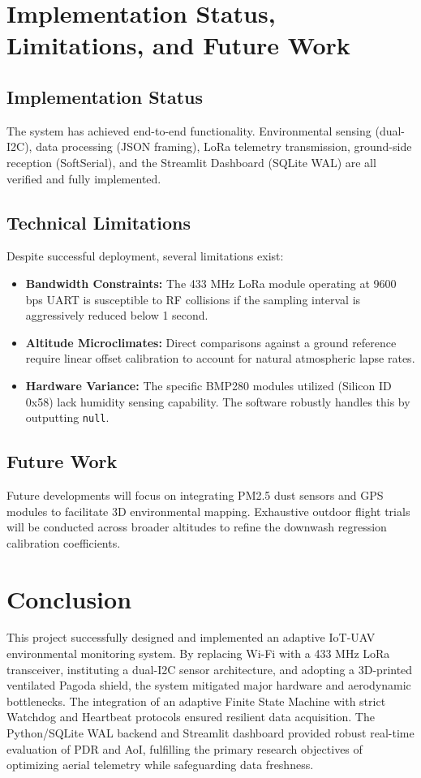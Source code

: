 \documentclass[11pt, a4paper]{article}
\begin{document}
\section{Implementation Status, Limitations, and Future Work}
\subsection{Implementation Status}
The system has achieved end-to-end functionality. Environmental sensing (dual-I2C), data processing (JSON framing), LoRa telemetry transmission, ground-side reception (SoftSerial), and the Streamlit Dashboard (SQLite WAL) are all verified and fully implemented. 

\subsection{Technical Limitations}
Despite successful deployment, several limitations exist:
\begin{itemize}
    \item \textbf{Bandwidth Constraints:} The 433 MHz LoRa module operating at 9600 bps UART is susceptible to RF collisions if the sampling interval is aggressively reduced below 1 second.
    \item \textbf{Altitude Microclimates:} Direct comparisons against a ground reference require linear offset calibration to account for natural atmospheric lapse rates.
    \item \textbf{Hardware Variance:} The specific BMP280 modules utilized (Silicon ID 0x58) lack humidity sensing capability. The software robustly handles this by outputting \texttt{null}.
\end{itemize}

\subsection{Future Work}
Future developments will focus on integrating PM2.5 dust sensors and GPS modules to facilitate 3D environmental mapping. Exhaustive outdoor flight trials will be conducted across broader altitudes to refine the downwash regression calibration coefficients.

\section{Conclusion}
This project successfully designed and implemented an adaptive IoT-UAV environmental monitoring system. By replacing Wi-Fi with a 433 MHz LoRa transceiver, instituting a dual-I2C sensor architecture, and adopting a 3D-printed ventilated Pagoda shield, the system mitigated major hardware and aerodynamic bottlenecks. The integration of an adaptive Finite State Machine with strict Watchdog and Heartbeat protocols ensured resilient data acquisition. The Python/SQLite WAL backend and Streamlit dashboard provided robust real-time evaluation of PDR and AoI, fulfilling the primary research objectives of optimizing aerial telemetry while safeguarding data freshness.
\end{document}
